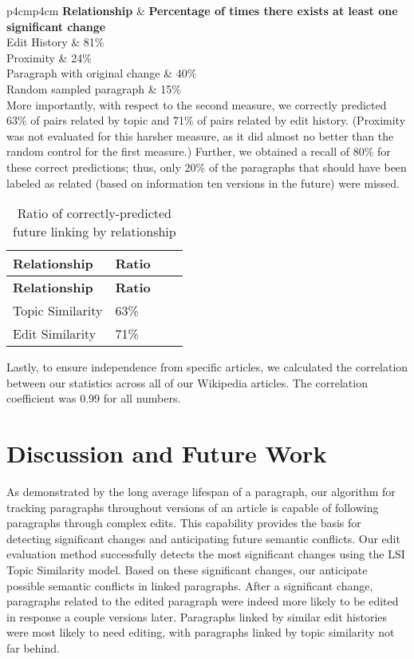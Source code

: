 {\textbar{}p{4cm}\textbar{}p{4cm}\textbar{}} \textbf{Relationship} \&
\textbf{Percentage of times there exists at least one significant
change}\\Edit History \& 81\%\\

Proximity \& 24\%\\

Paragraph with original change \& 40\%\\

Random sampled paragraph \& 15\%\\

More importantly, with respect to the second measure, we correctly
predicted 63\% of pairs related by topic and 71\% of pairs related by
edit history. (Proximity was not evaluated for this harsher measure, as
it did almost no better than the random control for the first measure.)
Further, we obtained a recall of 80\% for these correct predictions;
thus, only 20\% of the paragraphs that should have been labeled as
related (based on information ten versions in the future) were missed.

\begin{longtable}[c]{@{}llll@{}}
\caption{Ratio of correctly-predicted future linking by
relationship{}}\tabularnewline
\toprule
\textbf{Relationship} & \textbf{Ratio} & &\tabularnewline
\midrule
\endfirsthead
\toprule
\textbf{Relationship} & \textbf{Ratio} & &\tabularnewline
\midrule
\endhead
Topic Similarity & 63\% & &\tabularnewline
Edit Similarity & 71\% & &\tabularnewline
\bottomrule
\end{longtable}

Lastly, to ensure independence from specific articles, we calculated the
correlation between our statistics across all of our Wikipedia articles.
The correlation coefficient was 0.99 for all numbers.

\section{Discussion and Future Work}\label{discussion-and-future-work}

As demonstrated by the long average lifespan of a paragraph, our
algorithm for tracking paragraphs throughout versions of an article is
capable of following paragraphs through complex edits. This capability
provides the basis for detecting significant changes and anticipating
future semantic conflicts. Our edit evaluation method successfully
detects the most significant changes using the LSI Topic Similarity
model. Based on these significant changes, our anticipate possible
semantic conflicts in linked paragraphs. After a significant change,
paragraphs related to the edited paragraph were indeed more likely to be
edited in response a couple versions later. Paragraphs linked by similar
edit histories were most likely to need editing, with paragraphs linked
by topic similarity not far behind.

